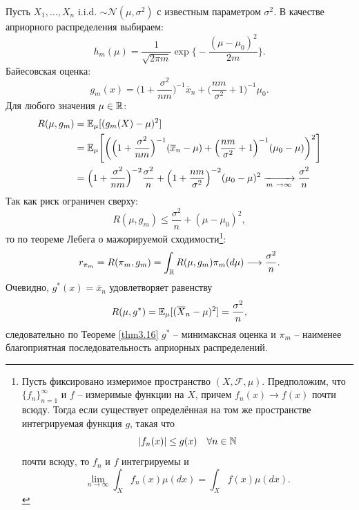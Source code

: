\begin{exmp}
	Пусть $X_1, \dots, X_n$ i.i.d. $\sim \mathcal{N}(\mu, \sigma^2)$ с известным параметром $\sigma^2$. В качестве априорного распределения выбираем:
	\[ h_m(\mu)=\frac{1}{\sqrt{2 \pi m}} \exp \Big \{ -\frac{(\mu-\mu_0)^2}{2m}\Big \}. \]
	Байесовская оценка:
	\[ g_m(x)=\Big( 1 + \frac{\sigma^2}{n m} \Big)^{-1} \overline{x}_n+\Big( \frac{n m}{\sigma^2}+1 \Big)^{-1} \mu_0.\]
	Для любого значения $\mu \in \mathbb{R}$:
	\[  
	\begin{aligned}
	R(\mu, g_m) & = \ME_\mu[(g_m(X)-\mu)^2] \\
	& = \ME_\mu\Bigg[\bigg(\Big( 1 + \frac{\sigma^2}{n m} \Big)^{-1} (\overline{x}_n-\mu)+\Big( \frac{n m}{\sigma^2}+1 \Big)^{-1} (\mu_0-\mu)\bigg)^2\Bigg] \\
	& = \Big(1 + \frac{\sigma^2}{nm}\Big)^{-2} \frac{\sigma^2}{n} + \Big( 1+\frac{nm}{\sigma^2} \Big)^{-2}(\mu_0-\mu)^2 \xrightarrow[m \ \rightarrow \infty]{} \frac{\sigma^2}{n}
	\end{aligned}
	\]
	Так как риск ограничен сверху:
	\[ R(\mu, g_m) \leq \frac{\sigma^2}{n} + (\mu - \mu_0)^2, \]
	то по теореме Лебега о мажорируемой сходимости\footnote{
		Пусть фиксировано измеримое пространство $(X, \mathcal{F}, \mu)$. Предположим, что $\{ f_n \}_{n=1}^\infty$ и $f$ -- измеримые функции на $X$, причем $f_n(x) \rightarrow f(x)$ почти всюду. Тогда если существует определённая на том же пространстве интегрируемая функция $g$, такая что
		\[ |f_n(x)| \leq g(x) \quad \forall n \in \mathbb{N} \]
		почти всюду, то $f_n$ и $f$ интегрируемы и
		\[ \lim\limits_{n \rightarrow \infty} \int_X f_n(x) \mu(dx) = \int_X f(x) \mu(dx). \]
		}:
	\[ r_{\pi_m}=R(\pi_m, g_m)=\int_{\mathbb{R}}R(\mu, g_m)\pi_m(d\mu) \longrightarrow \frac{\sigma^2}{n}. \]
	Очевидно, $g^*(x)=\overline{x}_n$ удовлетворяет равенству
	\[ R(\mu, g^*)=\mathbb{E}_\mu[(\overline{X}_n-\mu)^2]=\frac{\sigma^2}{n}, \]
	следовательно по Теореме \ref{thm3.16} $g^*$ -- минимаксная оценка и $\pi_m$ -- наименее благоприятная последовательность априорных распределений.
\end{exmp}

\raggedbottom
\pagebreak

